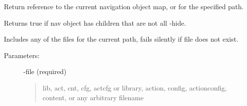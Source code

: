 \documentclass[letterpaper,10pt,english]{sphinxmanual}
\begin{document}
\begin{fulllineitems}

\begin{fulllineitems}
\label{knop_nav:knop_nav.getnav}
\end{fulllineitems}


\begin{fulllineitems}
Return reference to the current navigation object map, or for the specified path.

\end{fulllineitems}


\begin{fulllineitems}
\label{knop_nav:knop_nav.haschildren}
\end{fulllineitems}


\begin{fulllineitems}
Returns true if nav object has children that are not all -hide.

\end{fulllineitems}


\begin{fulllineitems}
\label{knop_nav:knop_nav.include}
\end{fulllineitems}


\begin{fulllineitems}
Includes any of the files for the current path, fails silently if file does not exist.
\begin{description}
\item[{Parameters:}] \leavevmode
-file (required)
\begin{quote}

lib, act, cnt, cfg, actcfg or library, action, config, actionconfig,
content, or any arbitrary filename
\end{quote}


\end{description}
\end{fulllineitems}
\end{fulllineitems}
\end{document}
